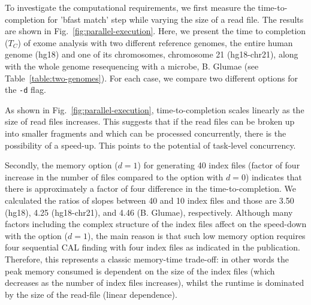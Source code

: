 \documentclass{cpeauth}
\begin{document}

To investigate the computational requirements, we first measure the
time-to-completion for 'bfast match' step while varying the size of a
read file.  The results are shown in
Fig.~\ref{fig:parallel-execution}. %
Here, we present the time to completion ($T_C$) of exome analysis with
two different reference genomes, the entire human genome (hg18) and
one of its chromosomes, chromosome 21 (hg18-chr21), along with the whole genome
resequencing with a microbe, B. Glumae\cite{kim2011} (see Table~\ref{table:two-genomes}).  For
each case, we compare two different options for the \texttt{-d} flag.

As shown in Fig.~\ref{fig:parallel-execution}, time-to-completion 
scales linearly as the size of read files increases.
This suggests that if the read files can be broken up into smaller
fragments and which can be processed concurrently, there is the
possibility of a speed-up. This points to the potential of task-level
concurrency.


Secondly, the memory option ($d=1$) for generating 40 index files
(factor of four increase in the number of files compared to the option with $d=0$) indicates that there is
approximately a factor of four difference in the time-to-completion.
We calculated the ratios of slopes between 40 and 10 index files and
those are 3.50 (hg18), 4.25 (hg18-chr21), and 4.46 (B. Glumae),
respectively.  
Although many factors including the complex structure of the index
files affect on the speed-down with the option ($d=1$), the main
reason is that such low memory option requires four sequential CAL
finding with four index files as indicated in the
publication\cite{bfast2009}.  Therefore, this represents a classic
memory-time trade-off: in other words the peak memory consumed is
dependent on the size of the index files (which decreases as the
number of index files increases), whilst the runtime is dominated by
the size of the read-file (linear dependence).
\end{document}

